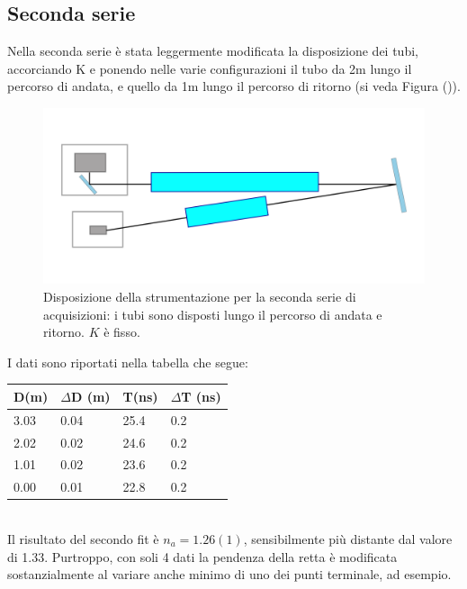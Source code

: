 \documentclass[journal, a4paper]{IEEEtran}
\begin{document}
\subsection{Seconda serie}
Nella seconda serie è stata leggermente modificata la disposizione dei tubi, accorciando K e ponendo nelle varie configurazioni il tubo da 2m lungo il percorso di andata, e quello da 1m lungo il percorso di ritorno (si veda Figura ()).\\

\begin{figure}
\centering
\includegraphics[width=0.9\linewidth]{./disegn_secondaserie}
\caption{Disposizione della strumentazione per la seconda serie di acquisizioni: i tubi sono disposti lungo il percorso di andata e ritorno. $K$ è fisso.}
\label{fig:disegn_secondaserie}
\end{figure}


I dati sono riportati nella tabella che segue:

\begin{table}
\centering
\begin{tabular}{l|l|l|l}
\hline
D(m) & $\Delta$D (m) & T(ns) & $\Delta$T (ns)\\
\hline
3.03 & 0.04 & 25.4 & 0.2 \\
2.02 & 0.02 & 24.6 & 0.2 \\
1.01 & 0.02 & 23.6 & 0.2 \\
0.00 & 0.01 & 22.8 & 0.2 \\
\hline
\end{tabular}
\end{table}
~\\

Il risultato del secondo fit è $n_a = 1.26(1)$, sensibilmente più distante dal valore di 1.33. Purtroppo, con soli 4 dati la pendenza della retta è modificata sostanzialmente al variare anche minimo di uno dei punti terminale, ad esempio.
\end{document}
